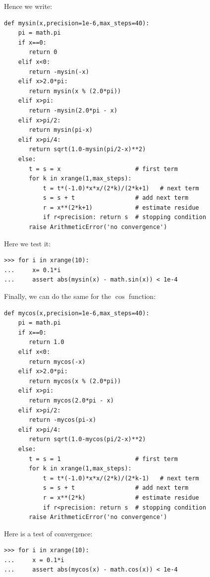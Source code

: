\documentclass[justified,sixbynine]{tufte-book}
\def\ft{\small\tt}
\theoremstyle{plain}%
\theoremstyle{definition}
\theoremstyle{remark}
\begin{document}
\begin{fullwidth}
Hence we write:

\begin{lstlisting}[caption={in file: {\ft nlib.py}}]
def mysin(x,precision=1e-6,max_steps=40):
    pi = math.pi
    if x==0:
       return 0
    elif x<0:
       return -mysin(-x)
    elif x>2.0*pi:
       return mysin(x % (2.0*pi))
    elif x>pi:
       return -mysin(2.0*pi - x)
    elif x>pi/2:
       return mysin(pi-x)
    elif x>pi/4:
       return sqrt(1.0-mysin(pi/2-x)**2)
    else:
       t = s = x                     # first term
       for k in xrange(1,max_steps):
           t = t*(-1.0)*x*x/(2*k)/(2*k+1)   # next term
           s = s + t                 # add next term
           r = x**(2*k+1)            # estimate residue
           if r<precision: return s  # stopping condition
       raise ArithmeticError('no convergence')
\end{lstlisting}

Here we test it:
\begin{lstlisting}[caption={in file: {\ft nlib.py}}]
>>> for i in xrange(10):
...     x= 0.1*i
...     assert abs(mysin(x) - math.sin(x)) < 1e-4
\end{lstlisting}

Finally, we can do the same for the $\cos$ function:

\begin{lstlisting}[caption={in file: {\ft nlib.py}}]
def mycos(x,precision=1e-6,max_steps=40):
    pi = math.pi
    if x==0:
       return 1.0
    elif x<0:
       return mycos(-x)
    elif x>2.0*pi:
       return mycos(x % (2.0*pi))
    elif x>pi:
       return mycos(2.0*pi - x)
    elif x>pi/2:
       return -mycos(pi-x)
    elif x>pi/4:
       return sqrt(1.0-mycos(pi/2-x)**2)
    else:
       t = s = 1                     # first term
       for k in xrange(1,max_steps):
           t = t*(-1.0)*x*x/(2*k)/(2*k-1)   # next term
           s = s + t                 # add next term
           r = x**(2*k)              # estimate residue
           if r<precision: return s  # stopping condition
       raise ArithmeticError('no convergence')
\end{lstlisting}

Here is a test of convergence:

\begin{lstlisting}[caption={in file: {\ft nlib.py}}]
>>> for i in xrange(10):
...     x = 0.1*i
...     assert abs(mycos(x) - math.cos(x)) < 1e-4
\end{lstlisting}


\end{fullwidth}
\end{document}
